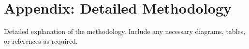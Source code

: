 \chapter{Appendix: Detailed Methodology}

Detailed explanation of the methodology. Include any necessary diagrams, tables, or references as required.
